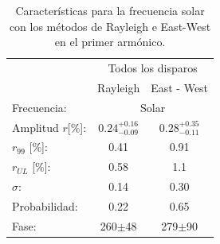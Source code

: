     \begin{table}[H]
        \begin{small}
            \begin{center}
                \begin{tabular}[c]{l|c|c|}
                    \cline{2-3}         & \multicolumn{2}{c|}{Todos los disparos} \\ \cline{2-3}
                                        & Rayleigh                      & East - West            \\\hline
\multicolumn{1}{|l|}{Frecuencia:}             &\multicolumn{2}{c|}{Solar}        \\
\multicolumn{1}{|l|}{Amplitud $r$[\%]:} & $0.24^{+0.16}_{-0.09}$        & $0.28^{+0.35}_{-0.11}$ \\
\multicolumn{1}{|l|}{$r_{99}$ [\%]:   } & 0.41                          & 0.91       \\
\multicolumn{1}{|l|}{$r_{UL}$ [\%]:   } & 0.58                          & 1.1       \\
\multicolumn{1}{|l|}{$\sigma$:        } & 0.14                          & 0.30          \\\hline
\multicolumn{1}{|l|}{Probabilidad:    } & 0.22                          & 0.65          \\
\multicolumn{1}{|l|}{Fase:            } & 260$\pm$48                    & 279$\pm$90    \\\hline
                \end{tabular}
            \end{center}
        \end{small}
        \caption{Características para la frecuencia solar con los métodos de Rayleigh  e East-West en el primer armónico.}
        \label{tab:solar_3}
    \end{table}

